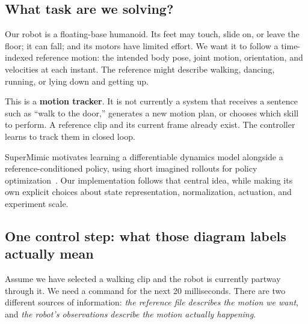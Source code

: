 \documentclass[11pt,a4paper]{article}
\begin{document}
\subsection{What task are we solving?}
Our robot is a floating-base humanoid. Its feet may touch, slide on, or leave the
floor; it can fall; and its motors have limited effort. We want it to follow a
time-indexed reference motion: the intended body pose, joint motion, orientation,
and velocities at each instant. The reference might describe walking, dancing,
running, or lying down and getting up.

This is a \textbf{motion tracker}. It is not currently a system that receives a
sentence such as ``walk to the door,'' generates a new motion plan, or chooses
which skill to perform. A reference clip and its current frame already exist.
The controller learns to track them in closed loop.

SuperMimic motivates learning a differentiable dynamics model alongside a
reference-conditioned policy, using short imagined rollouts for policy
optimization~\cite{supermimic}. Our implementation follows that central idea,
while making its own explicit choices about state representation, normalization,
actuation, and experiment scale.

\subsection{One control step: what those diagram labels actually mean}\label{sec:plainstep}
Assume we have selected a walking clip and the robot is currently partway through
it. We need a command for the next 20 milliseconds. There are two different
sources of information: \emph{the reference file describes the motion we want},
and \emph{the robot's observations describe the motion actually happening}.
\end{document}
